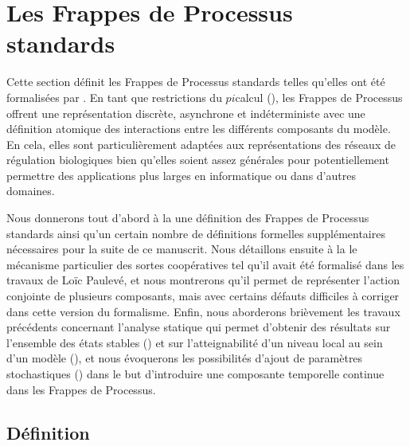 \section{Les Frappes de Processus standards}

Cette section définit les Frappes de Processus standards
telles qu'elles ont été formalisées par .
En tant que restrictions du $pi$\nbd calcul (),
les Frappes de Processus offrent une représentation discrète, asynchrone et indéterministe
avec une définition atomique des interactions entre les différents composants du modèle.
En cela,
elles sont particulièrement adaptées aux représentations des réseaux de régulation biologiques
bien qu'elles soient assez générales pour potentiellement permettre des applications plus
larges en informatique ou dans d'autres domaines.

Nous donnerons tout d'abord à la  une définition des Frappes de Processus standards
ainsi qu'un certain nombre de définitions formelles supplémentaires
nécessaires pour la suite de ce manuscrit.
Nous détaillons ensuite à la  le mécanisme particulier des sortes coopératives
tel qu'il avait été formalisé dans les travaux de Loïc Paulevé,
et nous montrerons qu'il permet de représenter l'action conjointe de plusieurs composants,
mais avec certains défauts difficiles à corriger dans cette version du formalisme.
Enfin, nous aborderons brièvement les travaux précédents
concernant l'analyse statique qui permet d'obtenir des résultats
sur l'ensemble des états stables ()
et sur l'atteignabilité d'un niveau local au sein d'un modèle (),
et nous évoquerons les possibilités d'ajout de paramètres stochastiques ()
dans le but d'introduire une composante temporelle continue dans les Frappes de Processus.



\subsection{Définition}

